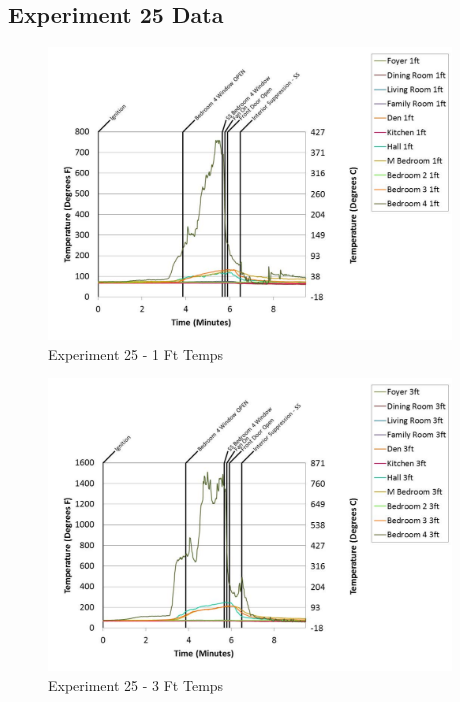 \documentclass{article}
\begin{document}
\begin{appendices}
		\clearpage
\clearpage		\large
\subsection{Experiment 25 Data} \label{App:Exp25Results} 

	\begin{figure}[h!]
		\centering
		\includegraphics[height=3.05in]{0_Images/Results_Charts/Exp_25_Charts/1FtTemps.pdf}
		\caption{Experiment 25 - 1 Ft Temps}
	\end{figure}
 

	\begin{figure}[h!]
		\centering
		\includegraphics[height=3.05in]{0_Images/Results_Charts/Exp_25_Charts/3FtTemps.pdf}
		\caption{Experiment 25 - 3 Ft Temps}
	\end{figure}
 
	\clearpage


\end{appendices}
\end{document}
